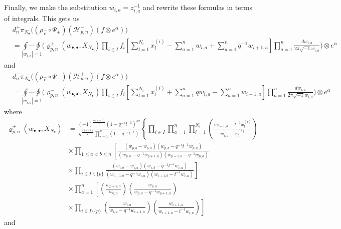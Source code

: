 \documentclass{amsart}
\theoremstyle{remark}
\numberwithin{thm}{section}
\numberwithin{equation}{section}
\begin{document}
Finally, we make the substitution $w_{i,a}=z_{i,a}^{-1}$ and rewrite these formulas in terms of integrals.
This gets us
\begin{align*}
&d_n^+\pi_{N_\bullet}\biggl( \left( \rho_{\vec{c}}\circ\Psi_+ \right)(\mathcal{H}_{p,n}^-)(f\otimes e^\alpha)\biggr)\\
&=\underset{|w_{i,a}|=1}{\oint\cdots\oint} \bigg(\varrho_{p,n}^+(w_{\bullet,\bullet},X_{N_\bullet})\prod_{i\in I}
f_i\left[ \sum_{l=1}^{N_i} x_{l}^{(i)}-\sum_{a=1}^nw_{i,a}+\sum_{a=1}^nq^{-1}w_{i+1,a} \right]
\prod_{a=1}^n \frac{dw_{i,a}}{2\pi\sqrt{-1}w_{i,a}}
\bigg)\otimes e^\alpha 
\end{align*}
and 
\begin{align*}
&d_n^-\pi_{N_\bullet}\biggl( \left( \rho_{\vec{c}}\circ\Psi_- \right)(\mathcal{H}_{p,n}^+)(f\otimes e^\alpha)\biggr)\\
&=\underset{|w_{i,a}|=1}{\oint\cdots\oint}\bigg(\varrho_{p,n}^-(w_{\bullet,\bullet},X_{N_\bullet})\prod_{i\in I}f_i\left[ \sum_{l=1}^{N_i} x_{l}^{(i)}+\sum_{a=1}^nqw_{i,a}-\sum_{a=1}^nw_{i+1,a} \right]
\prod_{a=1}^n \frac{dw_{i,a}}{2\pi\sqrt{-1}w_{i,a}}
\bigg)\otimes e^\alpha
\end{align*}
where
\begin{align*}
\varrho_{p,n}^+(w_{\bullet,\bullet},X_{N_\bullet})
&= \frac{(-1)^{\frac{n(n+1)}{2}}\left(1- q^{-1}t^{-1} \right)^{nr}}{q^{\frac{n(n-1)}{2}}\prod_{r=1}^n\left(1- q^{-r}t^{-r} \right)}
\left\{\prod_{i\in I}\prod_{a=1}^n\prod_{l=1}^{N_i}\left(\frac{ w_{i+1,a}-t^{-1}x_{l}^{(i)} }{ w_{i,a}-x_{l}^{(i)} }\right)\right.\\
&\times\prod_{1\le a<b\le n}
\left[
\frac{\left(w_{p,b}-w_{p,a}\right)\left(w_{p,b}-q^{-1}t^{-1}w_{p,a}\right)}{\left(w_{p,a}-q^{-1}w_{p+1,b}\right)\left(w_{p-1,b}-q^{-1}w_{p,a}\right)}\right.\\
\nonumber
&\times\left.\prod_{i\in I\backslash\{p\}}
\frac{\left(w_{i,b}-w_{i,a}\right)\left(w_{i,b}-q^{-1}t^{-1}w_{i,a}\right)}{\left(w_{i-1,b}-q^{-1}w_{i,a}\right)\left(w_{i+1,b}-t^{-1}w_{i,a}\right)}\right]\\
&\times\prod_{a=1}^n \left[
\left(\frac{w_{p+1,a}}{w_{0,a}}\right)\left(\frac{w_{p,a}}{w_{p,a}-q^{-1}w_{p+1,a}}\right)\right.\\
\nonumber
&\times\left.
\prod_{i\in I\setminus\{p\}}
\left(\frac{w_{i,a}}{w_{i,a}-q^{-1}w_{i+1,a}}\right)
\left( \frac{w_{i+1,a}}{w_{i+1,a}-t^{-1}w_{i,a}} \right)\right]
\end{align*}
and
\end{document}
